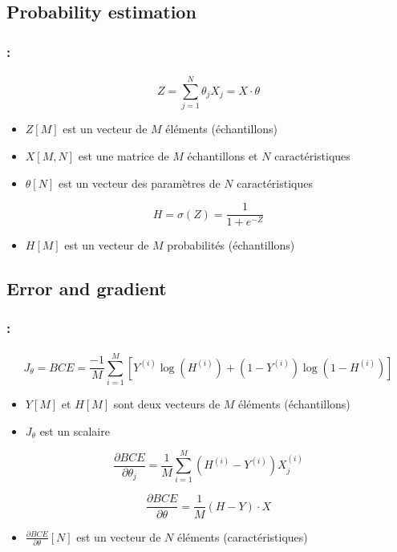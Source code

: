 \documentclass[xcolor=table]{beamer}
\begin{document}
\subsection{Probability estimation}

\begin{frame}
	\frametitle{\insertshortsubtitle: \insertsection}
	\framesubtitle{\insertsubsection}

	\[Z = \sum_{j=1}^{N} \theta_j X_j = X \cdot \theta\]
	\begin{itemize}
		\item $Z[M]$ est un vecteur de $M$ éléments (échantillons)
		\item $X[M, N]$ est une matrice de $M$ échantillons et $N$ caractéristiques
		\item $\theta[N]$ est un vecteur des paramètres de $N$ caractéristiques
	\end{itemize}

	\[H = \sigma(Z) = \frac{1}{1+e^{-Z}}\]

	\begin{itemize}
		\item $H[M]$ est un vecteur de $M$ probabilités (échantillons)
	\end{itemize}

\end{frame}

\subsection{Error and gradient}

\begin{frame}
	\frametitle{\insertshortsubtitle: \insertsection}
	\framesubtitle{\insertsubsection}
	
	\[J_\theta = BCE = \frac{-1}{M} \sum\limits_{i=1}^{M} [Y^{(i)} \log(H^{(i)}) + (1- Y^{(i)}) \log(1 - H^{(i)})]\]
	\begin{itemize}
		\item $Y[M]$ et $H[M]$ sont deux vecteurs de $M$ éléments (échantillons)
		\item $J_\theta$ est un scalaire
	\end{itemize}
	
	
	\[
	\frac{\partial BCE}{\partial \theta_j} = \frac{1}{M} \sum\limits_{i=1}^{M} (H^{(i)} - Y^{(i)}) X_j^{(i)}
	\]
	
	\[
	\frac{\partial BCE}{\partial \theta} = \frac{1}{M} (H - Y) \cdot X
	\]
	
	\begin{itemize}
		\item $\frac{\partial BCE}{\partial \theta}[N]$ est un vecteur de $N$ éléments (caractéristiques)
	\end{itemize}
	
\end{frame}
\end{document}
